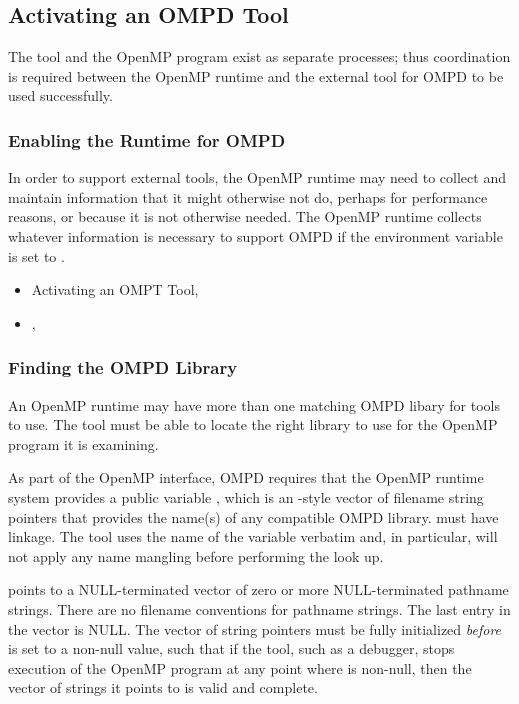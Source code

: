 \subsection{Activating an OMPD Tool}
\label{subsec:activating}

The tool and the OpenMP program
exist as separate processes; thus coordination is required between the OpenMP runtime
and the external tool for OMPD to be used successfully.

\subsubsection{Enabling the Runtime for OMPD}
\label{subsubsec:enabling-ompd}

In order to support external tools, the OpenMP runtime may need to collect
and maintain information that it might otherwise not do, perhaps
for performance reasons, or because it is not otherwise needed.
The OpenMP runtime collects whatever information is necessary
to support OMPD if the environment variable  is set to .

\crossreferences
\begin{itemize}
\item
  Activating an OMPT Tool, 
\item
  , 
\end{itemize}

\subsubsection{Finding the OMPD Library}
\label{subsubsec:finding-the-ompd}

An OpenMP runtime may have more than one matching OMPD libary for
tools to use.
The tool must be able to locate the right library to use
for the OpenMP program it is examining.

As part of the OpenMP interface, OMPD requires that the OpenMP
runtime system provides a public variable ,
which is an -style vector of filename string pointers that
provides the name(s) of any compatible OMPD library.
 must have  linkage.
The tool uses the name of the variable verbatim
and, in particular, will not apply any name mangling before
performing the look up.

 points to a NULL-terminated
vector of zero or more NULL-terminated pathname strings.
There are no filename conventions for pathname strings.
The last entry in the vector is NULL.
The vector of string pointers must be fully initialized \emph{before}
 is set to a non-null value,
such that if the tool, such as a debugger,
stops execution of the OpenMP program at any point where
 is non-null,
then the vector of strings it points to is valid and complete.

